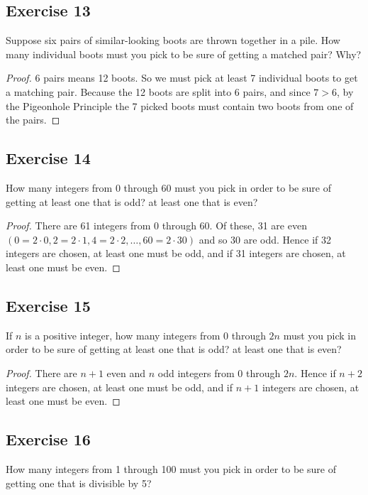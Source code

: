 \documentclass[14pt]{extarticle}
\begin{document}
\subsection{Exercise 13}
Suppose six pairs of similar-looking boots are thrown together in a pile. How many individual boots must you pick to be sure
of getting a matched pair? Why?

\begin{proof}
     6 pairs means 12 boots. So we must pick at least 7 individual boots to get a matching pair. Because the 12 boots are split
     into 6 pairs, and since \(7>6\), by the Pigeonhole Principle the 7 picked boots must contain two boots from one of the
     pairs.
\end{proof}

\subsection{Exercise 14}
How many integers from 0 through 60 must you pick in order to be sure of getting at least one that is odd? at least one that
is even?

\begin{proof}
     There are 61 integers from 0 through 60. Of these, 31 are even \((0 = 2 \cdot 0, 2 = 2 \cdot 1, 4 = 2 \cdot 2,
     \ldots, 60 = 2 \cdot 30)\) and so 30 are odd. Hence if 32 integers are chosen, at least one must be odd, and if 31
     integers are chosen, at least one must be even.
\end{proof}

\subsection{Exercise 15}
If \(n\) is a positive integer, how many integers from 0
through \(2n\) must you pick in order to be sure of getting
at least one that is odd? at least one that is even?

\begin{proof}
     There are \(n+1\) even and \(n\) odd integers from 0 through \(2n\). Hence if \(n+2\) integers are chosen, at least one
     must be odd, and if \(n+1\) integers are chosen, at least one must be even.
\end{proof}

\subsection{Exercise 16}
How many integers from 1 through 100 must you pick in order to be sure of getting one that is divisible by 5?
\end{document}
